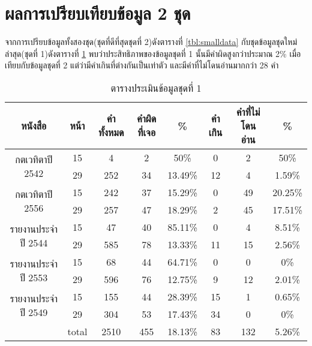 \section{ผลการเปรียบเทียบข้อมูล 2 ชุด}

จากการเปรียบข้อมูลทั้งสองชุด(ชุดที่ดีที่สุดชุดที่ 2)ดังตารางที่ \ref{tbl:smalldata} กับชุดข้อมูลชุดใหม่ล่าสุด(ชุดที่ 1)ดังตารางที่ \ref{tbl:bigdata} พบว่าประสิทธิภาพของข้อมูลชุดที่ 1 นั้นมีคำผิดสูงกว่าประมาณ 2\% เมื่อเทียบกับข้อมูลชุดที่ 2 แต่ว่ามีคำเกินที่ต่างกันเป็นเท่าตัว และมีคำที่ไม่โดนอ่านมากกว่า 28 คำ

\begin{table}[H]
    \caption{ตารางประเมินข้อมูลชุดที่ 1}\label{tbl:bigdata}
        \begin{tabular}{|c|c|c|c|c|c|c|c|}
            \hline
            หนังสือ                             & หน้า  & คำทั้งหมด & คำผิดที่เจอ & \%    & คำเกิน & คำที่ไม่โดนอ่าน & \%    \\ \hline
            \multirow{2}{*}{กตเวทิตาปี 2542}    & 15    & 4         & 2           & 50\%    & 0      & 2               & 50\%    \\ \cline{2-8} 
                                                & 29    & 252       & 34          & 13.49\% & 12     & 4               & 1.59\%  \\ \hline
            \multirow{2}{*}{กตเวทิตาปี 2556}    & 15    & 242       & 37          & 15.29\% & 0      & 49              & 20.25\% \\ \cline{2-8} 
                                                & 29    & 257       & 47          & 18.29\% & 2      & 45              & 17.51\% \\ \hline
            \multirow{2}{*}{รายงานประจำปี 2544} & 15    & 47        & 40          & 85.11\% & 0      & 4               & 8.51\%  \\ \cline{2-8} 
                                                & 29    & 585       & 78          & 13.33\% & 11     & 15              & 2.56\%  \\ \hline
            \multirow{2}{*}{รายงานประจำปี 2553} & 15    & 68        & 44          & 64.71\% & 0      & 0               & 0\%     \\ \cline{2-8} 
                                                & 29    & 596       & 76          & 12.75\% & 9      & 12              & 2.01\%  \\ \hline
            \multirow{2}{*}{รายงานประจำปี 2549} & 15    & 155       & 44          & 28.39\% & 15     & 1               & 0.65\%  \\ \cline{2-8} 
                                                & 29    & 304       & 53          & 17.43\% & 34     & 0               & 0\%     \\ \hline
                                                & total & 2510      & 455         & 18.13\% & 83     & 132             & 5.26\%  \\ \hline
            \end{tabular}
            \end{table}


